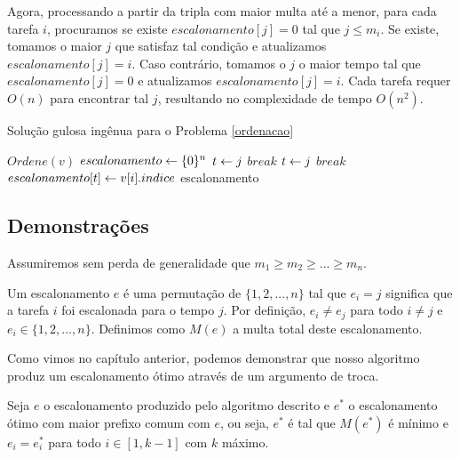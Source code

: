 Agora, processando a partir da tripla com maior multa até a menor, para cada tarefa $i$, procuramos se existe $escalonamento[j] = 0$ tal que $j \leq m_i$. Se existe, tomamos o maior $j$ que satisfaz tal condição e atualizamos $escalonamento[j] = i$. Caso contrário, tomamos o $j$ o maior tempo tal que $escalonamento[j] = 0$ e atualizamos $escalonamento[j] = i$. Cada tarefa requer $O(n)$ para encontrar tal $j$, resultando no complexidade de tempo $O(n^2)$.

\begin{algorithm}[H]
\caption{Solução gulosa ingênua para o Problema \ref{ordenacao}}
\label{ordenacao:code_naive}
\begin{algorithmic}[1]
    \State $Ordene(v)$ 
    \State $escalonamento \leftarrow \{0\}^n$
                \State $t \leftarrow j$
                \State $break$
            \EndIf
        \EndFor
                \State $t \leftarrow j$
                \State $break$
            \EndIf
        \EndFor
        \State $escalonamento[t] \leftarrow v[i].indice$
    \EndFor
    \State \Return escalonamento
\EndFunction
\end{algorithmic}
\end{algorithm}

\subsection{Demonstrações}

Assumiremos sem perda de generalidade que $m_1 \geq m_2 \geq ... \geq m_n$.

Um escalonamento $e$ é uma permutação de $\{1, 2, ..., n\}$ tal que $e_i = j$ significa que a tarefa $i$ foi escalonada para o tempo $j$. Por definição, $e_i \neq e_j$ para todo $i \neq j$ e $e_i \in \{1, 2, ..., n\}$. Definimos como $M(e)$ a multa total deste escalonamento.

Como vimos no capítulo anterior, podemos demonstrar que nosso algoritmo produz um escalonamento ótimo através de um argumento de troca.

Seja $e$ o escalonamento produzido pelo algoritmo descrito e $e^*$ o escalonamento ótimo com maior prefixo comum com $e$, ou seja, $e^*$ é tal que $M(e^*)$ é mínimo e $e_i = e^*_i$ para todo $i \in [1, k - 1]$ com $k$ máximo.


